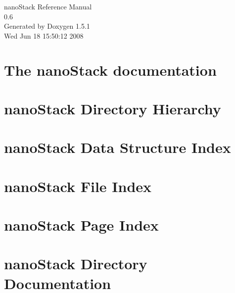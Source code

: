 \documentclass[a4paper]{book}
\begin{document}
\begin{titlepage}
\vspace*{7cm}
\begin{center}
{\Large nano\-Stack Reference Manual\\[1ex]\large 0.6 }\\
\vspace*{1cm}
{\large Generated by Doxygen 1.5.1}\\
\vspace*{0.5cm}
{\small Wed Jun 18 15:50:12 2008}\\
\end{center}
\end{titlepage}
\clearemptydoublepage
{}
\tableofcontents
\clearemptydoublepage
{}
\chapter{The nano\-Stack documentation }
\label{index}\hypertarget{index}{}
\chapter{nano\-Stack Directory Hierarchy}

\chapter{nano\-Stack Data Structure Index}

\chapter{nano\-Stack File Index}

\chapter{nano\-Stack Page Index}

\chapter{nano\-Stack Directory Documentation}



























\end{document}
